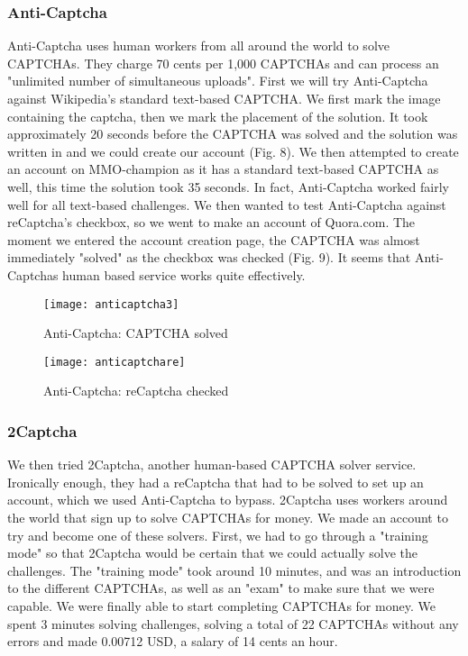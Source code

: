 \documentclass[a4paper]{IEEEtran}
\begin{document}
\subsubsection{Anti-Captcha}
Anti-Captcha uses human workers from all around the world to solve CAPTCHAs. They charge 70 cents per 1,000 CAPTCHAs and can process an "unlimited number of simultaneous uploads". First we will try Anti-Captcha against Wikipedia's standard text-based CAPTCHA. We first mark the image containing the captcha, then we mark the placement of the solution. It took approximately 20 seconds before the CAPTCHA was solved and the solution was written in and we could create our account (Fig. 8). We then attempted to create an account on MMO-champion as it has a standard text-based CAPTCHA as well, this time the solution took 35 seconds. In fact, Anti-Captcha worked fairly well for all text-based challenges. We then wanted to test Anti-Captcha against reCaptcha's checkbox, so we went to make an account of Quora.com. The moment we entered the account creation page, the CAPTCHA was almost immediately "solved" as the checkbox was checked (Fig. 9). It seems that Anti-Captchas human based service works quite effectively. 

\begin{figure}[t]
\centering
\texttt{[image: anticaptcha3]}
\caption{Anti-Captcha: CAPTCHA solved}
\label{Anti-Captcha Solved}
\end{figure}

\begin{figure}[t]
\centering
\texttt{[image: anticaptchare]}
\caption{Anti-Captcha: reCaptcha checked}
\label{Anti-Captcha reCaptcha}
\end{figure}

\subsubsection{2Captcha}
We then tried 2Captcha, another human-based CAPTCHA solver service. Ironically enough, they had a reCaptcha that had to be solved to set up an account, which we used Anti-Captcha to bypass. 2Captcha uses workers around the world that sign up to solve CAPTCHAs for money. We made an account to try and become one of these solvers. First, we had to go through a "training mode" so that 2Captcha would be certain that we could actually solve the challenges. The "training mode" took around 10 minutes, and was an introduction to the different CAPTCHAs, as well as an "exam" to make sure that we were capable. We were finally able to start completing CAPTCHAs for money. We spent 3 minutes solving challenges, solving a total of 22 CAPTCHAs without any errors and made 0.00712 USD, a salary of 14 cents an hour.
\end{document}
